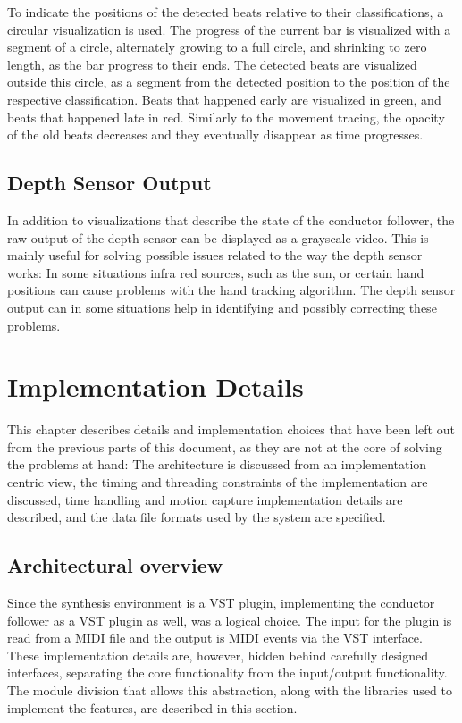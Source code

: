 To indicate the positions of the detected beats
relative to their classifications,
a circular visualization is used.
The progress of the current bar
is visualized with a segment of a circle,
alternately growing to a full circle,
and shrinking to zero length,
as the bar progress to their ends.
The detected beats are visualized outside this circle,
as a segment from the detected position
to the position of the respective classification.
Beats that happened early are visualized in green,
and beats that happened late in red.
Similarly to the movement tracing,
the opacity of the old beats decreases
and they eventually disappear as time progresses.

\section{Depth Sensor Output}

In addition to visualizations that describe
the state of the conductor follower,
the raw output of the depth sensor can be displayed
as a grayscale video.
This is mainly useful for solving possible issues
related to the way the depth sensor works:
In some situations infra red sources,
such as the sun,
or certain hand positions
can cause problems with the hand tracking algorithm.
The depth sensor output can in some situations help
in identifying and possibly correcting these problems.


\chapter{Implementation Details}
\label{chapter:implementation_details}

This chapter describes details and implementation choices
that have been left out from the previous parts of
this document,
as they are not at the core of solving the problems at hand:
The architecture is discussed from an implementation centric view,
the timing and threading constraints
of the implementation are discussed,
time handling and motion capture implementation details are described,
and the data file formats used by the system are specified.

\section{Architectural overview}

Since the synthesis environment is a VST plugin,
implementing the conductor follower as a VST plugin as well,
was a logical choice.
The input for the plugin is read from a MIDI file
and the output is MIDI events via the VST interface.
These implementation details are, however, hidden behind
carefully designed interfaces,
separating the core functionality from the input/output functionality.
The module division that allows this abstraction,
along with the libraries used to implement the features,
are described in this section.

